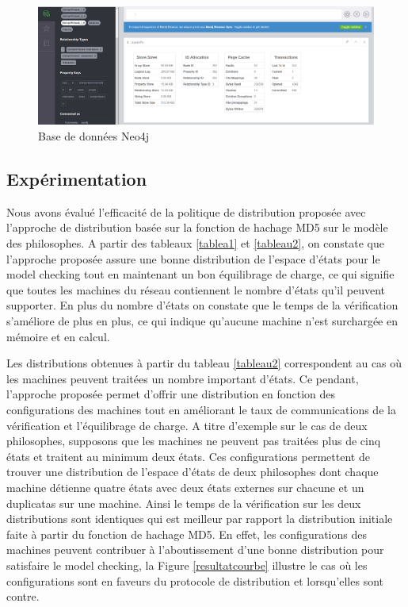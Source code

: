 \begin{figure} 
	\centering
	\includegraphics[width=1\linewidth]{img/bddneo4j}
	\caption{Base de données Neo4j} 
\end{figure}
\pagebreak
\subsection{Expérimentation}
Nous avons évalué l’efficacité de la politique de distribution proposée avec l’approche de distribution basée sur la fonction de hachage MD5 sur le modèle des philosophes. A partir des tableaux \ref{tablea1} et \ref{tableau2}, on constate que l’approche proposée assure une bonne distribution de l'espace d'états pour le model checking tout en maintenant un bon équilibrage de charge, ce qui signifie que toutes les machines du réseau contiennent le nombre d'états qu'il peuvent supporter. En plus du nombre d'états on constate que le temps de la vérification s'améliore de plus en plus, ce qui indique qu’aucune machine n’est surchargée en mémoire et en calcul.

Les distributions obtenues à partir du tableau \ref{tableau2} correspondent au cas o\`{u} les machines peuvent traitées un nombre important d'états. Ce pendant, l'approche proposée permet d'offrir une distribution en fonction des configurations des machines tout en améliorant le taux de communications de la vérification et l'équilibrage de charge. A titre d'exemple sur le cas de deux philosophes, supposons que les machines ne peuvent pas traitées plus de cinq états et traitent au minimum deux états. Ces configurations permettent de trouver une distribution de l'espace d'états de deux philosophes dont chaque machine détienne quatre états avec deux états externes sur chacune et un duplicatas sur une machine. Ainsi le temps de la vérification sur les deux distributions sont identiques qui est meilleur par rapport la distribution initiale faite à partir du fonction de hachage MD5.
En effet, les configurations des machines peuvent contribuer à l'aboutissement d'une bonne distribution pour satisfaire le model checking, la Figure \ref{resultatcourbe} illustre le cas o\`{u} les configurations sont en faveurs du protocole de distribution et lorsqu'elles sont contre.

